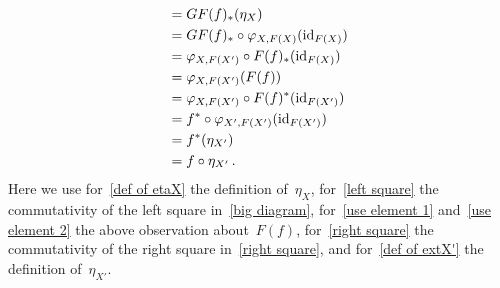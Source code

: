 \begin{remark}
\begin{enumerate}
\begin{align}
        ={}&  GF(f)_*( \eta_X ) \notag  \\
        ={}&  GF(f)_* \circ \varphi_{X,F(X)}( \mathrm{id}_{F(X)} )  \label{def of etaX} \\
        ={}&  \varphi_{X, F(X')} \circ F(f)_*( \mathrm{id}_{F(X)} ) \label{left square} \\
        ={}&  \varphi_{X, F(X')}(F(f))  \label{use element 1} \\
        ={}&  \varphi_{X, F(X')} \circ F(f)^*( \mathrm{id}_{F(X')} )  \label{use element 2} \\
        ={}&  f^* \circ \varphi_{X', F(X')}( \mathrm{id}_{F(X')} )  \label{right square}  \\
        ={}&  f^* ( \eta_{X'} \label{def of extX'} )  \\
        ={}&  f \circ \eta_{X'} \notag  \,.
      \end{align}
      Here we use for~\eqref{def of etaX} the definition of~$\eta_X$, for~\eqref{left square} the commutativity of the left square in~\eqref{big diagram}, for~\eqref{use element 1} and~\eqref{use element 2} the above observation about~$F(f)$, for~\eqref{right square} the commutativity of the right square in~\eqref{right square}, and for~\eqref{def of extX'} the definition of~$\eta_{X'}$.
      

\end{enumerate}
\end{remark}
